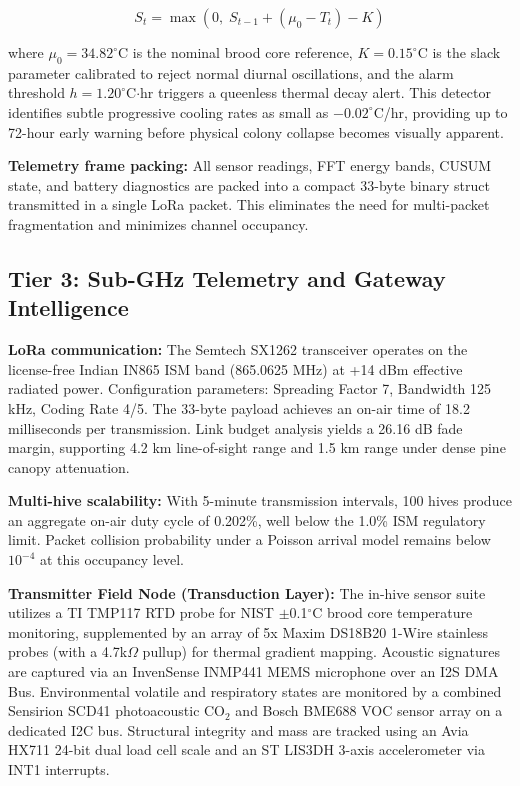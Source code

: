 \documentclass[12pt,a4paper]{article}
\begin{document}
\begin{equation}
S_t = \max\left(0,\; S_{t-1} + (\mu_0 - T_t) - K\right)
\label{eq:cusum}
\end{equation}

where $\mu_0 = 34.82^\circ$C is the nominal brood core reference, $K = 0.15^\circ$C is the slack parameter calibrated to reject normal diurnal oscillations, and the alarm threshold $h = 1.20^\circ$C$\cdot$hr triggers a queenless thermal decay alert. This detector identifies subtle progressive cooling rates as small as $-0.02^\circ$C/hr, providing up to 72-hour early warning before physical colony collapse becomes visually apparent.

\textbf{Telemetry frame packing:} All sensor readings, FFT energy bands, CUSUM state, and battery diagnostics are packed into a compact 33-byte binary struct transmitted in a single LoRa packet. This eliminates the need for multi-packet fragmentation and minimizes channel occupancy.

\subsection{Tier 3: Sub-GHz Telemetry and Gateway Intelligence}

\textbf{LoRa communication:} The Semtech SX1262 transceiver operates on the license-free Indian IN865 ISM band (865.0625 MHz) at +14 dBm effective radiated power. Configuration parameters: Spreading Factor 7, Bandwidth 125 kHz, Coding Rate 4/5. The 33-byte payload achieves an on-air time of 18.2 milliseconds per transmission. Link budget analysis yields a 26.16 dB fade margin, supporting 4.2 km line-of-sight range and 1.5 km range under dense pine canopy attenuation.



\textbf{Multi-hive scalability:} With 5-minute transmission intervals, 100 hives produce an aggregate on-air duty cycle of 0.202\%, well below the 1.0\% ISM regulatory limit. Packet collision probability under a Poisson arrival model remains below $10^{-4}$ at this occupancy level.

\textbf{Transmitter Field Node (Transduction Layer):} The in-hive sensor suite utilizes a TI TMP117 RTD probe for NIST $\pm$0.1$^\circ$C brood core temperature monitoring, supplemented by an array of 5x Maxim DS18B20 1-Wire stainless probes (with a 4.7k$\Omega$ pullup) for thermal gradient mapping. Acoustic signatures are captured via an InvenSense INMP441 MEMS microphone over an I2S DMA Bus. Environmental volatile and respiratory states are monitored by a combined Sensirion SCD41 photoacoustic CO$_2$ and Bosch BME688 VOC sensor array on a dedicated I2C bus. Structural integrity and mass are tracked using an Avia HX711 24-bit dual load cell scale and an ST LIS3DH 3-axis accelerometer via INT1 interrupts.
\end{document}
